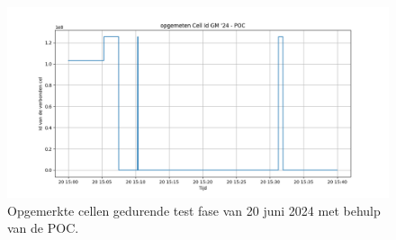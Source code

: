\begin{figure}
    \includegraphics[width=1.2\linewidth]{graphics/CellId_graph_40min_POC}
    \caption[Opgemerkte cellen gedurende test fase van 20 juni 2024 met behulp van de POC.]{Opgemerkte cellen gedurende test fase van 20 juni 2024 met behulp van de POC.}
    \label{fig:CI_POC}
\end{figure}
